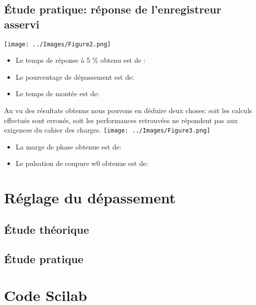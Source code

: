 \documentclass[a4paper,12pt]{article}
\begin{document}
		\subsection{Étude pratique: réponse de l'enregistreur asservi}
			\begin{center}
				\texttt{[image: ../Images/Figure2.png]} 	
				\begin{itemize}
					\item Le temps de réponse à 5 \% obtenu est de :
					\item Le pourcentage de dépassement est de:
					\item Le temps de montée est de: 			
				\end{itemize}
				Au vu des résultats obtenus nous pouvons en déduire deux choses: soit les calculs effectués sont erronés, soit les performances retrouvées ne répondent pas aux exigences du cahier des charges.
				\texttt{[image: ../Images/Figure3.png]}
				\begin{itemize}
					\item La marge de phase obtenue est de:
					\item Le pulsation de coupure w0 obtenue est de:
				\end{itemize}
			\end{center}


	\section{Réglage du dépassement}
		\subsection{Étude théorique}
			\newpage
		\subsection{Étude pratique} 
	
	\section{Code Scilab}
\end{document}

